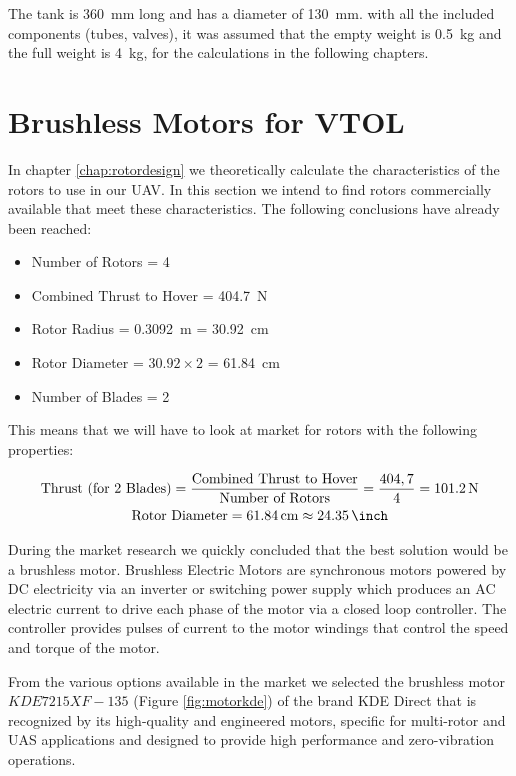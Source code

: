\documentclass[english,fira]{ist-report}
\begin{document}
 The tank is \SI{360}{\milli\meter} long and has a diameter of \SI{130}{\milli\meter}. with all the included components (tubes, valves), it was assumed that the empty weight is \SI{0.5}{\kilogram} and the full weight is \SI{4}{\kilogram}, for the calculations in the following chapters.



\newpage
\section{Brushless Motors for VTOL}
In chapter \ref{chap:rotordesign} we theoretically calculate the characteristics of the rotors to use in our UAV. In this section we intend to find rotors commercially available that meet these characteristics.  The following conclusions have already been reached:
\begin{itemize}
    \item Number of Rotors = 4
    \item Combined Thrust to Hover = \SI{404.7}{\newton}
    \item Rotor Radius = \SI{0.3092}{\meter} = \SI{30.92}{\centi\meter}
    \item Rotor Diameter = $30.92\times 2$ = \SI{61.84}{\centi\meter}
    \item Number of Blades = 2
\end{itemize}

This means that we will have to look at market for rotors with the following properties:

\begin{gather}
    \text{Thrust (for 2 Blades)}=\frac{\text{Combined Thrust to Hover}}{\text{Number of Rotors}}=\frac{404,7}{4}=\SI{101.2}{\newton} \\
    \text{Rotor Diameter} = \SI{61.84}{\centi\meter} \approx \SI{24.35}{\inch}
\end{gather}
 
During the market research we quickly concluded that the best solution would be a brushless motor. Brushless Electric Motors are synchronous motors powered by DC electricity via an inverter or switching power supply which produces an AC electric current to drive each phase of the motor via a closed loop controller. The controller provides pulses of current to the motor windings that control the speed and torque of the motor.\par
From the various options available in the market we selected the brushless motor $KDE7215XF-135$ (Figure \ref{fig:motorkde}) of the brand KDE Direct that is recognized by its high-quality and engineered motors, specific for multi-rotor and UAS applications and designed to provide high performance and zero-vibration operations.
\end{document}
